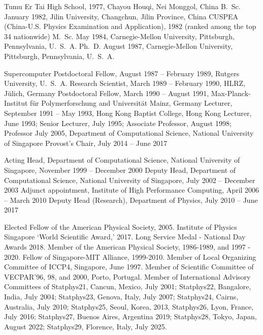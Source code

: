 
\bul Tumu Er Tai High School, 1977, Chayou Houqi, Nei Monggol, China
\bul B.~Sc. January 1982, Jilin University, Changchun, 
        Jilin Province, China
\bul CUSPEA (China-U.S. Physics Examination and Application), 1982 (ranked among the top 34 nationwide)
\bul M.~Sc. May 1984, Carnegie-Mellon University, Pittsburgh, 
        Pennsylvania, U.~S.~A.
\bul Ph.~D. August 1987,  Carnegie-Mellon University, Pittsburgh, 
        Pennsylvania, U.~S.~A.
        
\bul Supercomputer Postdoctoral Fellow,  August 1987 -- February 1989, 
        Rutgers University, U.~S.~A.
\bul Research Scientist, March 1989 -- February 1990, 
        HLRZ, J\"ulich, Germany
\bul Postdoctoral Fellow,  March 1990 -- August 1991,
        Max-Planck-Institut f\"ur Polymerforschung and 
        Universit\"at Mainz, Germany
\bul Lecturer, September 1991 -- May 1993, Hong Kong Baptist College,
        Hong Kong 
\bul Lecturer, June 1993; Senior Lecturer, July 1995; Associate Professor, 
        August 1998; Professor July 2005, Department of 
        Computational Science, National University of Singapore
\bul Provost's Chair, July 2014 -- June 2017
        
\bul Acting Head, Department of Computational Science, National
        University of Singapore, November 1999 -- December 2000
\bul Deputy Head, Department of Computational Science, National
        University of Singapore, July 2002 -- December 2003
\bul Adjunct appointment, Institute of High Performance Computing,
     April 2006 -- March 2010 
\bul Deputy Head (Research), Department of Physics, July 2010 -- June 2017




\bul Elected Fellow of the American Physical Society, 2005.
\bul Institute of Physics Singapore `World Scientific Award,' 2017.
\bul Long Service Medal - National Day Awards 2018.
\bul Member of the American Physical Society, 1986-1989, and 1997 - 2020.
\bul Fellow of Singapore-MIT Alliance, 1999-2010.
\bul Member of Local Organizing Committee of ICCP4, Singapore, June 1997.
\bul Member of Scientific Committee of VECPAR'96, 98, 
       and 2000, Porto, Portugal. 
\bul Member of International Advisory Committees of 
       Statphys21, Cancun, Mexico, July 2001; 
       Statphys22, Bangalore, India, July 2004;
       Statphys23, Genova, Italy, July 2007; 
       Statphys24, Cairns, Australia, July 2010;
       Statphys25, Seoul, Korea, 2013,
       Statphys26, Lyon, France, July 2016;
       Statphys27, Buenos Aires, Argentina 2019;
       Statphys28, Tokyo, Japan, August 2022;
       Statphys29, Florence, Italy, July 2025.
       
